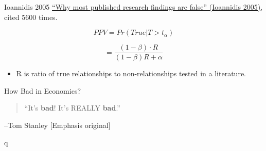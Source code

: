 \documentclass{beamer}
\begin{document}
\begin{frame}[label=Ioannidis]{Ioannidis 2005}
\href{http://journals.plos.org/plosmedicine/article?id=10.1371/journal.pmed.0020124}{``Why most published research findings are false'' (Ioannidis 2005)}, cited 5600 times.

\[PPV = Pr(True|T > t_{\alpha})\]


\[= \frac{(1 - \beta) \cdot R}{(1 - \beta)R + \alpha}\]

\begin{itemize}
\item
  R is ratio of true relationships to non-relationships tested in a literature.
\end{itemize}

\hyperlink{derive}{}
\end{frame}

\begin{frame}{How Bad in Economics?}
\begin{quote} ``It's \textbf{bad}! It's REALLY \textbf{bad}.'' \\ \end{quote}
--Tom Stanley [Emphasis original]

\href{http://www.meta-analysis.cz/conference/Stanley_p.pdf}{}
\end{frame}

{ %
    \begin{frame}[plain]q
     \end{frame}
}
\end{document}
